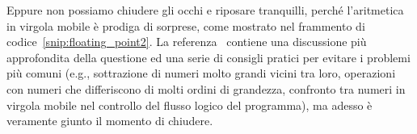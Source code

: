 
Eppure non possiamo chiudere gli occhi e riposare tranquilli, perché l'aritmetica in
virgola mobile è prodiga di sorprese, come mostrato nel frammento di
codice~\ref{snip:floating_point2}. La referenza~\cite{bush_floating_point}
contiene una discussione più approfondita della questione ed una serie di consigli
pratici per evitare i problemi più comuni (e.g., sottrazione di numeri molto grandi
vicini tra loro, operazioni con numeri che differiscono di molti ordini di grandezza,
confronto tra numeri in virgola mobile nel controllo del flusso logico del programma),
ma adesso è veramente giunto il momento di chiudere.
